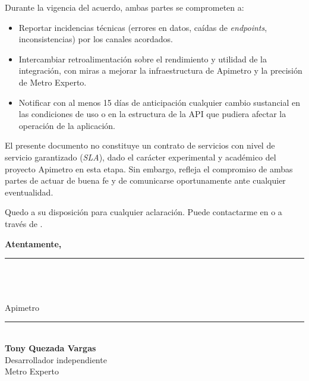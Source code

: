 
Durante la vigencia del acuerdo, ambas partes se comprometen a:

\begin{itemize}[leftmargin=1.5em]
  \item Reportar incidencias técnicas (errores en datos, caídas de
        \textit{endpoints}, inconsistencias) por los canales acordados.
  \item Intercambiar retroalimentación sobre el rendimiento y utilidad de
        la integración, con miras a mejorar la infraestructura de Apimetro
        y la precisión de Metro Experto.
  \item Notificar con al menos 15 días de anticipación cualquier cambio
        sustancial en las condiciones de uso o en la estructura de la API
        que pudiera afectar la operación de la aplicación.
\end{itemize}


El presente documento no constituye un contrato de servicios con nivel de
servicio garantizado (\textit{SLA}), dado el carácter experimental y académico
del proyecto Apimetro en esta etapa. Sin embargo, refleja el compromiso de
ambas partes de actuar de buena fe y de comunicarse oportunamente ante
cualquier eventualidad.

Quedo a su disposición para cualquier aclaración. Puede contactarme en
\href{mailto:\ContactoEmail}{\ContactoEmail} o a través de
\href{https://\ContactoWeb}{\ContactoWeb}.

\vspace{1.2cm}
\noindent\textbf{Atentamente,}

\vspace{2.0cm}

\noindent
\begin{minipage}[t]{0.48\textwidth}
  {\color{ColorPrincipal}\rule{\linewidth}{0.6pt}}\\[0.2cm]
  \textbf{\FirmanteName}\\
  {\small \FirmanteCargo}\\
  {\small\color{ColorAcento}Apimetro}
\end{minipage}
\hfill
\begin{minipage}[t]{0.48\textwidth}
  {\color{ColorPrincipal}\rule{\linewidth}{0.6pt}}\\[0.2cm]
  \textbf{Tony Quezada Vargas}\\
  {\small Desarrollador independiente}\\
  {\small\color{ColorAcento}Metro Experto}
\end{minipage}

